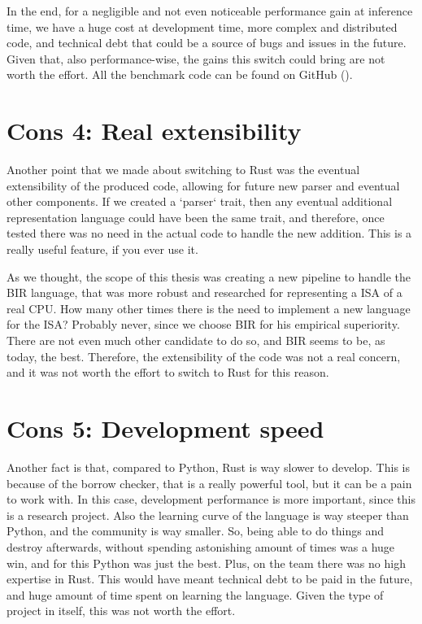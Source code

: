 In the end, for a negligible and not even noticeable performance gain at
inference time, we have a huge cost at development time, more complex and
distributed code, and technical debt that could be a source of bugs and issues in
the future. Given that, also performance-wise, the gains this switch could bring
are not worth the effort. All the benchmark code can be found on GitHub (\cite{benchmark}).

\section[Real extensibility]{Cons 4: Real extensibility}
Another point that we made about switching to Rust was the eventual extensibility
of the produced code, allowing for future new parser and eventual other
components. If we created a `parser` trait, then any eventual additional
representation language could have been the same trait, and therefore, once
tested there was no need in the actual code to handle the new addition. This is a
really useful feature, if you ever use it.

As we thought, the scope of this thesis was creating a new pipeline to handle the
BIR language, that was more robust and researched for representing a ISA of a
real CPU. How many other times there is the need to implement a new language for
the ISA? Probably never, since we choose BIR for his empirical superiority.
There are not even much other candidate to do so, and BIR seems to be, as today,
the best. Therefore, the extensibility of the code was not a real concern, and
it was not worth the effort to switch to Rust for this reason.

\section[Development speed]{Cons 5: Development speed}
Another fact is that, compared to Python, Rust is way slower to develop. This is
because of the borrow checker, that is a really powerful tool, but it can be a pain
to work with. In this case, development performance is more important, since
this is a research project. Also the learning curve of the language is way steeper
than Python, and the community is way smaller. So, being able to do things and
destroy afterwards, without spending astonishing amount of times was a huge win,
and for this Python was just the best. Plus, on the team there was no high
expertise in Rust. This would have meant technical debt to be paid in the future,
and huge amount of time spent on learning the language. Given the type of project
in itself, this was not worth the effort.

